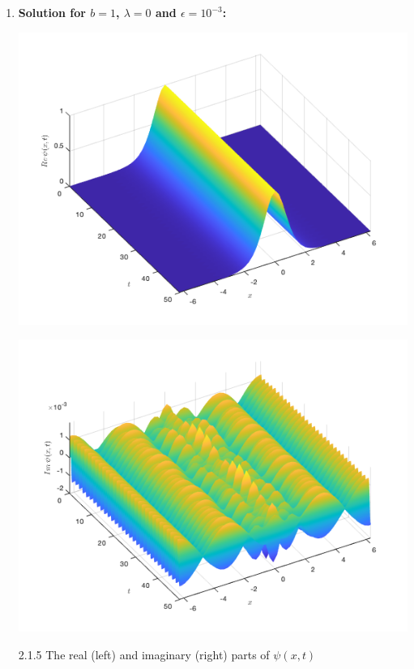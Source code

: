\documentclass[12pt, letterpaper, twoside]{article}
\begin{document}
\begin{enumerate}[label=(\roman*)]
\item \textbf{Solution for $b = 1$, $\lambda=0$ and $\epsilon = 10^{-3}$:}
\begin{multicols}{2}
\begin{center}
    \includegraphics[scale=0.35]{Figures/(b1real).png}
\end{center}
\begin{center}
    \includegraphics[scale=0.35]{Figures/(b1imag).png}
\end{center}
\end{multicols}
\figurename{ 2.1.5 The real (left) and imaginary (right) parts of $\psi(x, t)$}



\end{enumerate}
\end{document}
